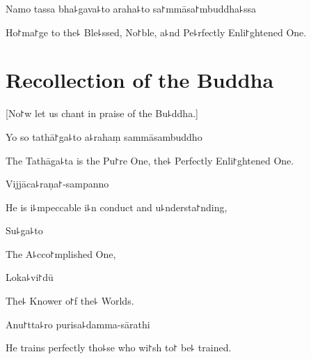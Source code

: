 \vspace{\baselineskip}

Namo tassa bha꜕gava꜕to araha꜕to sa꜓mmāsa꜓mbuddha꜕ssa


\begin{english}
  Ho꜓ma꜓ge to the꜕ Ble꜕ssed, No꜓ble, a꜕nd Pe꜕rfectly Enli꜓ghtened One.

\end{english}

\clearpage


\chapter{Recollection of the Buddha}                %

\begin{leader}
\end{leader}

\begin{english}
  [No꜓w let us chant in praise of the Bu꜕ddha.]
\end{english}

Yo so tathā꜓ga꜕to a꜕rahaṃ sammāsambuddho

\begin{english}
  The Tathāga꜕ta is the Pu꜓re One, the꜕ Perfectly Enli꜓ghtened One.
\end{english}

Vijjāca꜕raṇa꜓-sampanno

\begin{english}
  He is i꜕mpeccable i꜕n conduct and u꜕ndersta꜓nding,
\end{english}

Su꜕ga꜕to

\begin{english}
  The A꜕cco꜓mplished One,
\end{english}

Loka꜕vi꜓dū

\begin{english}
  The꜕ Knower o꜓f the꜕ Worlds.
\end{english}

Anu꜓tta꜕ro purisa꜕damma-sārathi

\begin{english}
  He trains perfectly tho꜕se who wi꜓sh to꜓ be꜕ trained.
\end{english}

